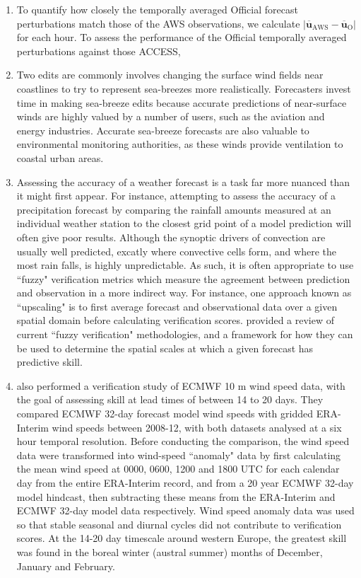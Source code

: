 \documentclass{article}
\begin{document}
\begin{enumerate}
\item
To quantify how closely the temporally averaged Official forecast perturbations match those of the AWS observations, we calculate 
$\left\lvert \overline{\boldsymbol{u}}_{\text{AWS}} - \overline{\boldsymbol{u}}_{\text{O}} \right\rvert$ for each hour. To assess the performance of the Official temporally averaged perturbations against those ACCESS,
\item
Two edits are commonly involves changing the surface wind fields near coastlines to try to represent sea-breezes more realistically. Forecasters invest time in making sea-breeze edits because accurate predictions of near-surface winds are highly valued by a number of users, such as the aviation and energy \citep{smith09} industries. Accurate sea-breeze forecasts are also valuable to environmental monitoring authorities, as these winds provide ventilation to coastal urban areas.
\item
Assessing the accuracy of a weather forecast is a task far more nuanced than it might first appear. For instance, attempting to assess the accuracy of a precipitation forecast by comparing the rainfall amounts measured at an individual weather station to the closest grid point of a model prediction will often give poor results. Although the synoptic drivers of convection are usually well predicted, excatly where convective cells form, and where the most rain falls, is highly unpredictable. As such, it is often appropriate to use ``fuzzy" verification metrics which measure the agreement between prediction and observation in a more indirect way. For instance, one approach known as ``upscaling" is to first average forecast and observational data over a given spatial domain before calculating verification scores. \citet{ebert08} provided a review of current ``fuzzy verification" methodologies, and a framework for how they can be used to determine the spatial scales at which a given forecast has predictive skill.
\item
\citet{lynch14} also performed a verification study of ECMWF 10 m wind speed data, with the goal of assessing skill at lead times of between 14 to 20 days. They compared ECMWF 32-day forecast model wind speeds with gridded ERA-Interim wind speeds between 2008-12, with both datasets analysed at a six hour temporal resolution. Before conducting the comparison, the wind speed data were transformed into wind-speed ``anomaly" data by first calculating the mean wind speed at 0000, 0600, 1200 and 1800 UTC for each calendar day from the entire ERA-Interim record, and from a 20 year ECMWF 32-day model hindcast, then subtracting these means from the ERA-Interim and ECMWF 32-day model data respectively. Wind speed anomaly data was used so that stable seasonal and diurnal cycles did not contribute to verification scores. At the 14-20 day timescale around western Europe, the greatest skill was found in the boreal winter (austral summer) months of December, January and February.  

\end{enumerate}
\end{document}

